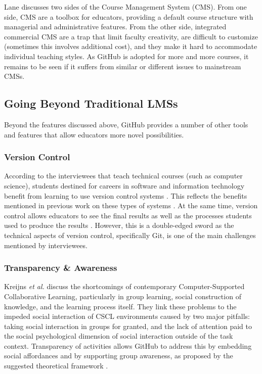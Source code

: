 Lane \cite{lane2008toolbox} discusses two sides of the Course Management System (CMS). From one side, CMS are a toolbox for educators, providing a default course structure with managerial and administrative features. From the other side, integrated commercial CMS are a trap that limit faculty creativity, are difficult to customize (sometimes this involves additional cost), and they make it hard to accommodate individual teaching styles. As GitHub is adopted for more and more courses, it remains to be seen if it suffers from similar or different issues to mainstream CMSs.

\subsection{Going Beyond Traditional LMSs}
Beyond the features discussed above, GitHub provides a number of other tools and features that allow educators more novel possibilities.

\subsubsection{Version Control}
According to the interviewees that teach technical courses (such as computer science), students destined for careers in software and information technology benefit from learning to use version control systems \cite{britton2013using}. This reflects the benefits mentioned in previous work on these types of systems \cite{reid2005learning}. At the same time, version control allows educators to see the final results as well as the processes students used to produce the results \cite{glassy2006using}. However, this is a double-edged sword as the technical aspects of version control, specifically Git, is one of the main challenges mentioned by interviewees.

\subsubsection{Transparency \& Awareness}
Kreijns \textit{et al.} \cite{kreijns2013social} discuss the shortcomings of contemporary Computer-Supported Collaborative Learning, particularly in group learning, social construction of knowledge, and the learning process itself. They link these problems to the impeded social interaction of CSCL environments caused by two major pitfalls: taking social interaction in groups for granted, and the lack of attention paid to the social psychological dimension of social interaction outside of the task context. Transparency of activities allows GitHub to address this by embedding social affordances and by supporting group awareness, as proposed by the suggested theoretical framework \cite{kreijns2002sociability}.

